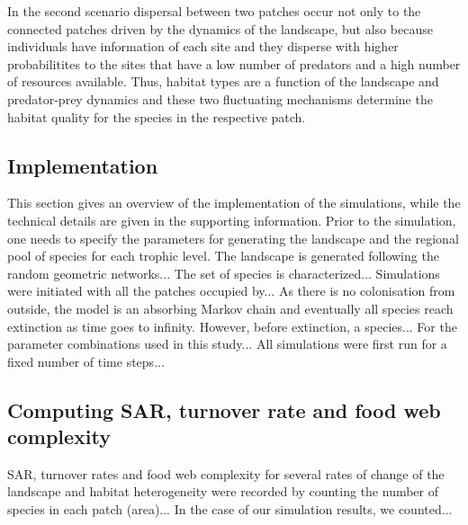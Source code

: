 In the second scenario dispersal between two patches occur not only to
the connected patches driven by the dynamics of the landscape, but
also because individuals have information of each site and they
disperse with higher probabilitites to the sites that have a low
number of predators and a high number of resources available. Thus,
habitat types are a function of the landscape and predator-prey
dynamics and these two fluctuating mechanisms determine the habitat
quality for the species in the respective patch.

\subsection{Implementation}

This section gives an overview of the implementation of the
simulations, while the technical details are given in the supporting
information. Prior to the simulation, one needs to specify the
parameters for generating the landscape and the regional pool of
species for each trophic level. The landscape is generated following
the random geometric networks... The set of species is
characterized... Simulations were initiated with all the patches
occupied by... As there is no colonisation from outside, the model is
an absorbing Markov chain and eventually all species reach extinction
as time goes to infinity. However, before extinction, a species... For
the parameter combinations used in this study... All simulations were
first run for a fixed number of time steps...

\subsection{Computing SAR, turnover rate and food web complexity}

SAR, turnover rates and food web complexity for several rates of
change of the landscape and habitat heterogeneity were recorded by
counting the number of species in each patch (area)... In the case of
our simulation results, we counted...


